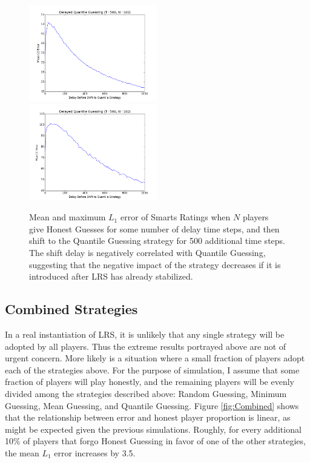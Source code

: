 \begin{figure}[H]
\centerline{%
\includegraphics[width=0.5\textwidth]{figures/robustness/Delayed_Quantile_Guessing41.png}%
\includegraphics[width=0.5\textwidth] {figures/robustness/Delayed_Quantile_Guessing42.png}%
}%
\caption{Mean and maximum $L_1$ error of Smarts Ratings when $N$ players give Honest Guesses for some number of delay time steps, and then shift to the Quantile Guessing strategy for 500 additional time steps. The shift delay is negatively correlated with Quantile Guessing, suggesting that the negative impact of the strategy decreases if it is introduced after LRS has already stabilized.}
\label{fig:QuantileGuessDelay}
\end{figure}

\subsection{Combined Strategies}

In a real instantiation of LRS, it is unlikely that any single strategy will be adopted by all players. Thus the extreme results portrayed above are not of urgent concern. More likely is a situation where a small fraction of players adopt each of the strategies above. For the purpose of simulation, I assume that some fraction of players will play honestly, and the remaining players will be evenly divided among the strategies described above: Random Guessing, Minimum Guessing, Mean Guessing, and Quantile Guessing. Figure \ref{fig:Combined} shows that the relationship between error and honest player proportion is linear, as might be expected given the previous simulations. Roughly, for every additional 10\% of players that forgo Honest Guessing in favor of one of the other strategies, the mean $L_1$ error increases by 3.5.

